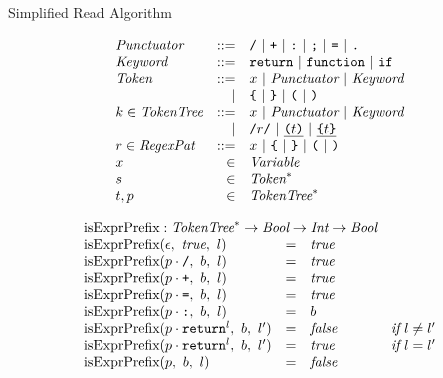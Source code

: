 \documentclass[preprint,10pt]{sigplanconf}
\begin{document}
\begin{displayfigure*}{\label{fig:simpleread}Simplified Read Algorithm}
\begin{minipage}[t]{0.5\linewidth}
\[
\begin{array}{lrl}
  \textit{Punctuator} &::=& \texttt{/} ~|~ \texttt{+} ~|~ \texttt{:} ~|~
  \texttt{;} ~|~ \texttt{=} ~|~ \texttt{.}
  \\
  \textit{Keyword} &::=& \texttt{return} ~|~ \texttt{function}~|~
  \texttt{if}
  \\


   \textit{Token} &::=& x ~|~ \textit{Punctuator} ~|~ \textit{Keyword}
  \\
  &|& 
  \texttt{\{} ~|~ 
  \texttt {\}} ~|~  
  \texttt{(} ~|~ 
  \texttt{)}
  \\
  k \in \textit{TokenTree} &::=& x ~|~ \textit{Punctuator} ~|~ \textit{Keyword}
  \\
  &|& \texttt{/}r\texttt{/} ~|~ \underline{ \texttt{(} t \texttt{)}} ~|~ \underline{ \texttt{\{} t \texttt{\}} }
  \\
  r \in \textit{RegexPat} &::=& x ~|~ \texttt{\{} ~|~ \texttt{\}}
  ~|~ \texttt{(} ~|~ \texttt{)}
  \\
  x &\in& \textit{Variable}
  \\
  s &\in& \textit{Token}^{*}
  \\
  t,p &\in& \textit{TokenTree}^{*}
\end{array}
\]
\end{minipage}
\begin{minipage}[t]{0.5\linewidth}
\[
  \begin{array}{lcll}
    \multicolumn{3}{l}{\textrm{isExprPrefix} : \TT^{*} \rightarrow
      \textit{Bool} \rightarrow \textit{Int} \rightarrow \textit{Bool}}
    \\
    \isobject(\epsilon,~\textit{true},~l) &=& \textit{true}
    \\
    \isobject(p \cdot \div,~b,~l) &=& \textit{true}
    \\
    \isobject(p \cdot \texttt{+},~b,~l) &=& \textit{true}
    \\
    \isobject(p \cdot \texttt{=},~b,~l) &=& \textit{true}
    \\
    \isobject(p \cdot \texttt{:},~b,~l) &=& b
    \\
    \isobject(p \cdot \texttt{return}^{l},~b,~l') &=& \textit{false} 
    & \textit{if}~l \not = l'
    \\
    \isobject(p \cdot \texttt{return}^{l},~b,~l') &=& \textit{true} 
    & \textit{if}~l = l'
    \\
    \isobject(p ,~b,~l) &=& \textit{false}
    \\

\end{array}\]
\end{minipage}
\end{displayfigure*}
\end{document}
